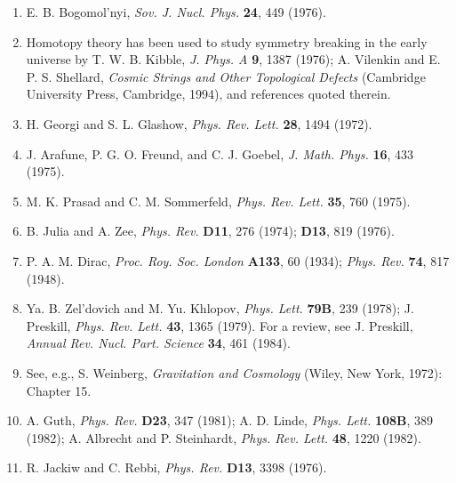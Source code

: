 \begin{enumerate}
\item {}\label{ch23-ref-10}
E. B. Bogomol'nyi, \emph{Sov. J. Nucl. Phys.} \textbf{24}, 449 (1976).

\item {}\label{ch23-ref-11}
Homotopy theory has been used to study symmetry breaking in the early
universe by T. W. B. Kibble, \emph{J. Phys. A} \textbf{9}, 1387 (1976);
A. Vilenkin and E. P. S. Shellard, \emph{Cosmic Strings and Other
Topological Defects} (Cambridge University Press, Cambridge, 1994), and
references quoted therein.

\item {}\label{ch23-ref-12}
H. Georgi and S. L. Glashow, \emph{Phys. Rev. Lett.} \textbf{28}, 1494
(1972).

\item {}\label{ch23-ref-13}
J. Arafune, P. G. O. Freund, and C. J. Goebel, \emph{J. Math. Phys.}
\textbf{16}, 433 (1975).

\item {}\label{ch23-ref-14}
M. K. Prasad and C. M. Sommerfeld, \emph{Phys. Rev. Lett.} \textbf{35},
760 (1975).

\item {}\label{ch23-ref-15}
B. Julia and A. Zee, \emph{Phys. Rev.} \textbf{D11}, 276 (1974);
\textbf{D13}, 819 (1976).

\item {}\label{ch23-ref-16}
P. A. M. Dirac, \emph{Proc. Roy. Soc. London} \textbf{A133}, 60 (1934);
\emph{Phys. Rev.} \textbf{74}, 817 (1948).

\item {}\label{ch23-ref-17}
Ya. B. Zel'dovich and M. Yu. Khlopov, \emph{Phys. Lett.} \textbf{79B},
239 (1978); J. Preskill, \emph{Phys. Rev. Lett.} \textbf{43}, 1365
(1979). For a review, see J. Preskill, \emph{Annual Rev. Nucl. Part.
Science} \textbf{34}, 461 (1984).

\item {}\label{ch23-ref-18}
See, e.g., S. Weinberg, \emph{Gravitation and Cosmology} (Wiley,
New York, 1972): Chapter 15.

\item {}\label{ch23-ref-19}
A. Guth, \emph{Phys. Rev.} \textbf{D23}, 347 (1981); A. D. Linde,
\emph{Phys. Lett.} \textbf{108B}, 389 (1982); A. Albrecht and
P. Steinhardt, \emph{Phys. Rev. Lett.} \textbf{48}, 1220 (1982).

\item {}\label{ch23-ref-20}
R. Jackiw and C. Rebbi, \emph{Phys. Rev.} \textbf{D13}, 3398 (1976).


\end{enumerate}
